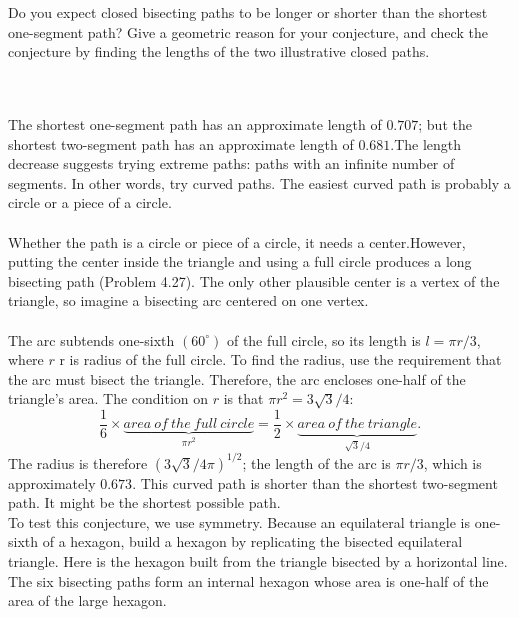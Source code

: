 \documentclass[12pt]{book}
\begin{document}
\colorbox{light-gray}{
\begin{minipage}{\textwidth}
Do you expect closed bisecting paths to be longer or shorter than the shortest one-segment path? Give a geometric reason for your conjecture, and check the conjecture by finding the lengths of the two illustrative closed paths.
\end{minipage}
}\\

\\

\noindent The shortest one-segment path has an approximate length of $0.707$; but the shortest two-segment path has an approximate length of $0.681$.The length decrease suggests trying extreme paths: paths with an infinite number of segments. In other words, try curved paths. The easiest curved path is probably a circle or a piece of a circle.\\

\\

\noindent Whether the path is a circle or piece of a circle, it needs a center.However, putting the center inside the triangle and using a full circle produces a long bisecting path (Problem 4.27). The only other plausible center is a vertex of the triangle, so imagine a
bisecting arc centered on one vertex.\\

\\

\noindent The arc subtends one-sixth $(60^{\circ})$ of the full circle, so its length is $l=\pi r\!/3$, where $r$ r is radius of the full circle. To find the radius, use the requirement that the arc must bisect the triangle. Therefore, the arc encloses one-half
of the triangle's area. The condition on $r$ is that $\pi r^2=3\sqrt{3}\!/4$:
\begin{equation}
\frac 16 \times \underbrace{area~of~the~full~circle}_{\pi r^2}=\frac 12 \times \underbrace{area~of~the~triangle}_{\sqrt{3}\!/4}.
\end{equation}
\noindent The radius is therefore $(3\sqrt{3}\!/4\pi)^{1\!/2}$; the length of the arc is $\pi r\!/3$, which is approximately $0.673$. 
This curved path is shorter than the shortest two-segment path. It might be the shortest possible path.\\

\noindent To test this conjecture, we use symmetry. Because an equilateral triangle is one-sixth of a hexagon, build a hexagon by replicating the bisected equilateral triangle. Here is the hexagon built from the triangle bisected by a horizontal line.\\

\noindent The six bisecting paths form an internal hexagon whose area is one-half of the area of the large hexagon.\\

\\
\end{document}
